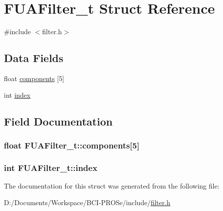 \hypertarget{struct_f_u_a_filter__t}{}\section{F\+U\+A\+Filter\+\_\+t Struct Reference}
\label{struct_f_u_a_filter__t}


{\ttfamily \#include $<$filter.\+h$>$}

\subsection*{Data Fields}
\begin{DoxyCompactItemize}
\item 
float \hyperlink{struct_f_u_a_filter__t_a0f6c09a21fcb5d3408118065afcf3038}{components} \mbox{[}5\mbox{]}
\item 
int \hyperlink{struct_f_u_a_filter__t_a7db55b077252c5e4fbd02c21ac0fb902}{index}
\end{DoxyCompactItemize}


\subsection{Field Documentation}
\subsubsection[{\texorpdfstring{components}{components}}]{\setlength{\rightskip}{0pt plus 5cm}float F\+U\+A\+Filter\+\_\+t\+::components\mbox{[}5\mbox{]}}\hypertarget{struct_f_u_a_filter__t_a0f6c09a21fcb5d3408118065afcf3038}{}\label{struct_f_u_a_filter__t_a0f6c09a21fcb5d3408118065afcf3038}
\subsubsection[{\texorpdfstring{index}{index}}]{\setlength{\rightskip}{0pt plus 5cm}int F\+U\+A\+Filter\+\_\+t\+::index}\hypertarget{struct_f_u_a_filter__t_a7db55b077252c5e4fbd02c21ac0fb902}{}\label{struct_f_u_a_filter__t_a7db55b077252c5e4fbd02c21ac0fb902}


The documentation for this struct was generated from the following file\+:\begin{DoxyCompactItemize}
\item 
D\+:/\+Documents/\+Workspace/\+B\+C\+I-\/\+P\+R\+O\+Se/include/\hyperlink{filter_8h}{filter.\+h}\end{DoxyCompactItemize}
